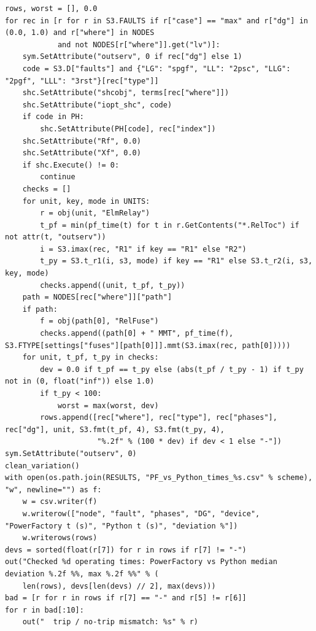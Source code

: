 \documentclass[12pt,a4paper]{article}
\begin{document}
\begin{lstlisting}
rows, worst = [], 0.0
for rec in [r for r in S3.FAULTS if r["case"] == "max" and r["dg"] in (0.0, 1.0) and r["where"] in NODES
            and not NODES[r["where"]].get("lv")]:
    sym.SetAttribute("outserv", 0 if rec["dg"] else 1)
    code = S3.D["faults"] and {"LG": "spgf", "LL": "2psc", "LLG": "2pgf", "LLL": "3rst"}[rec["type"]]
    shc.SetAttribute("shcobj", terms[rec["where"]])
    shc.SetAttribute("iopt_shc", code)
    if code in PH:
        shc.SetAttribute(PH[code], rec["index"])
    shc.SetAttribute("Rf", 0.0)
    shc.SetAttribute("Xf", 0.0)
    if shc.Execute() != 0:
        continue
    checks = []
    for unit, key, mode in UNITS:
        r = obj(unit, "ElmRelay")
        t_pf = min(pf_time(t) for t in r.GetContents("*.RelToc") if not attr(t, "outserv"))
        i = S3.imax(rec, "R1" if key == "R1" else "R2")
        t_py = S3.t_r1(i, s3, mode) if key == "R1" else S3.t_r2(i, s3, key, mode)
        checks.append((unit, t_pf, t_py))
    path = NODES[rec["where"]]["path"]
    if path:
        f = obj(path[0], "RelFuse")
        checks.append((path[0] + " MMT", pf_time(f), S3.FTYPE[settings["fuses"][path[0]]].mmt(S3.imax(rec, path[0]))))
    for unit, t_pf, t_py in checks:
        dev = 0.0 if t_pf == t_py else (abs(t_pf / t_py - 1) if t_py not in (0, float("inf")) else 1.0)
        if t_py < 100:
            worst = max(worst, dev)
        rows.append([rec["where"], rec["type"], rec["phases"], rec["dg"], unit, S3.fmt(t_pf, 4), S3.fmt(t_py, 4),
                     "%.2f" % (100 * dev) if dev < 1 else "-"])
sym.SetAttribute("outserv", 0)
clean_variation()
with open(os.path.join(RESULTS, "PF_vs_Python_times_%s.csv" % scheme), "w", newline="") as f:
    w = csv.writer(f)
    w.writerow(["node", "fault", "phases", "DG", "device", "PowerFactory t (s)", "Python t (s)", "deviation %"])
    w.writerows(rows)
devs = sorted(float(r[7]) for r in rows if r[7] != "-")
out("Checked %d operating times: PowerFactory vs Python median deviation %.2f %%, max %.2f %%" % (
    len(rows), devs[len(devs) // 2], max(devs)))
bad = [r for r in rows if r[7] == "-" and r[5] != r[6]]
for r in bad[:10]:
    out("  trip / no-trip mismatch: %s" % r)
\end{lstlisting}
\end{document}
